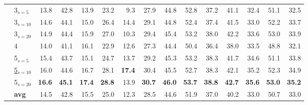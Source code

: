 \begin{longtable}{llrrrrrrrrrrrrr}
 & 3$_{s=5}$ & 13.8 & 42.8 & 13.9 & 23.2 & 9.3 & 27.9 & 44.8 & 52.8 & 37.2 & 41.1 & 32.4 & 51.1 & 32.5 \\
 & 3$_{s=10}$ & 14.6 & 44.1 & 15.0 & 26.4 & 14.4 & 29.1 & 44.8 & 52.4 & 37.4 & 41.5 & 33.0 & 52.2 & 33.7 \\
 & 3$_{s=20}$ & 14.9 & 44.4 & 15.9 & 27.0 & 10.3 & 29.4 & 45.4 & 53.2 & 38.0 & 42.2 & 33.6 & 53.0 & 33.9 \\
 & 4 & 14.0 & 41.1 & 16.1 & 22.9 & 12.6 & 27.3 & 44.4 & 50.4 & 36.4 & 38.0 & 33.5 & 48.8 & 32.1 \\
 & 5$_{s=5}$ & 15.4 & 43.7 & 15.1 & 24.7 & 13.7 & 29.2 & 45.3 & 53.2 & 38.3 & 41.7 & 34.6 & 51.1 & 33.8 \\
 & \underline{5$_{s=10}$} & 16.0 & 44.6 & 16.7 & 28.1 & \textbf{17.4} & 30.4 & 45.5 & 52.7 & 38.3 & 42.1 & 35.2 & 52.3 & 34.9 \\
 & 5$_{s=20}$ & \textbf{16.6} & \textbf{45.1} & \textbf{17.4} & \textbf{28.8} & 13.9 & \textbf{30.7} & \textbf{46.0} & \textbf{53.7} & \textbf{38.8} & \textbf{42.7} & \textbf{35.6} & \textbf{53.0} & \textbf{35.2} \\
\cmidrule(l){2-15}
 & \textbf{avg} & 14.5 & 42.8 & 15.5 & 25.0 & 12.3 & 28.5 & 44.6 & 51.9 & 37.0 & 40.2 & 33.0 & 50.7 & 33.0 \\
\end{longtable}
\endgroup

